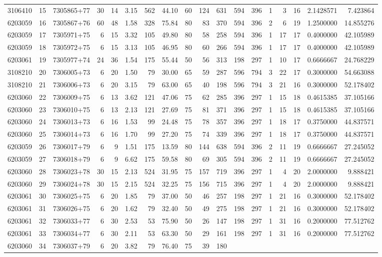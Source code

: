 \documentclass[
]{article}
\begin{document}
\begin{longtable}[]{@{}rrlrrrrrrrrrrrrrrr@{}}
3106410 & 15 & 7305865+77 & 30 & 14 & 3.15 & 562 & 44.10 & 60 & 124 &
631 & 594 & 396 & 1 & 3 & 16 & 2.1428571 & 7.423864\tabularnewline
6203059 & 16 & 7305867+76 & 60 & 48 & 1.58 & 328 & 75.84 & 80 & 83 & 370
& 594 & 396 & 2 & 6 & 19 & 1.2500000 & 14.855276\tabularnewline
6203059 & 17 & 7305971+75 & 6 & 15 & 3.32 & 105 & 49.80 & 80 & 58 & 258
& 594 & 396 & 1 & 17 & 17 & 0.4000000 & 42.105989\tabularnewline
6203059 & 18 & 7305972+75 & 6 & 15 & 3.13 & 105 & 46.95 & 80 & 60 & 266
& 594 & 396 & 1 & 17 & 17 & 0.4000000 & 42.105989\tabularnewline
6203061 & 19 & 7305977+74 & 24 & 36 & 1.54 & 175 & 55.44 & 50 & 56 & 313
& 198 & 297 & 1 & 10 & 17 & 0.6666667 & 24.768229\tabularnewline
3108210 & 20 & 7306005+73 & 6 & 20 & 1.50 & 79 & 30.00 & 65 & 59 & 287 &
596 & 794 & 3 & 22 & 17 & 0.3000000 & 54.663088\tabularnewline
3108210 & 21 & 7306006+73 & 6 & 20 & 3.15 & 79 & 63.00 & 65 & 40 & 198 &
596 & 794 & 3 & 21 & 16 & 0.3000000 & 52.178402\tabularnewline
6203060 & 22 & 7306009+75 & 6 & 13 & 3.62 & 121 & 47.06 & 75 & 62 & 285
& 396 & 297 & 1 & 15 & 18 & 0.4615385 & 37.105166\tabularnewline
6203060 & 23 & 7306010+75 & 6 & 13 & 2.13 & 121 & 27.69 & 75 & 81 & 371
& 396 & 297 & 1 & 15 & 18 & 0.4615385 & 37.105166\tabularnewline
6203060 & 24 & 7306013+73 & 6 & 16 & 1.53 & 99 & 24.48 & 75 & 78 & 357 &
396 & 297 & 1 & 18 & 17 & 0.3750000 & 44.837571\tabularnewline
6203060 & 25 & 7306014+73 & 6 & 16 & 1.70 & 99 & 27.20 & 75 & 74 & 339 &
396 & 297 & 1 & 18 & 17 & 0.3750000 & 44.837571\tabularnewline
6203059 & 26 & 7306017+79 & 6 & 9 & 1.51 & 175 & 13.59 & 80 & 144 & 638
& 594 & 396 & 2 & 11 & 19 & 0.6666667 & 27.245052\tabularnewline
6203059 & 27 & 7306018+79 & 6 & 9 & 6.62 & 175 & 59.58 & 80 & 69 & 305 &
594 & 396 & 2 & 11 & 19 & 0.6666667 & 27.245052\tabularnewline
6203060 & 28 & 7306023+78 & 30 & 15 & 2.13 & 524 & 31.95 & 75 & 157 &
719 & 396 & 297 & 1 & 4 & 20 & 2.0000000 & 9.888421\tabularnewline
6203060 & 29 & 7306024+78 & 30 & 15 & 2.15 & 524 & 32.25 & 75 & 156 &
715 & 396 & 297 & 1 & 4 & 20 & 2.0000000 & 9.888421\tabularnewline
6203061 & 30 & 7306025+75 & 6 & 20 & 1.85 & 79 & 37.00 & 50 & 46 & 257 &
198 & 297 & 1 & 21 & 16 & 0.3000000 & 52.178402\tabularnewline
6203061 & 31 & 7306026+75 & 6 & 20 & 1.62 & 79 & 32.40 & 50 & 49 & 275 &
198 & 297 & 1 & 21 & 16 & 0.3000000 & 52.178402\tabularnewline
6203061 & 32 & 7306033+77 & 6 & 30 & 2.53 & 53 & 75.90 & 50 & 26 & 147 &
198 & 297 & 1 & 31 & 16 & 0.2000000 & 77.512762\tabularnewline
6203061 & 33 & 7306034+77 & 6 & 30 & 2.11 & 53 & 63.30 & 50 & 29 & 161 &
198 & 297 & 1 & 31 & 16 & 0.2000000 & 77.512762\tabularnewline
6203060 & 34 & 7306037+79 & 6 & 20 & 3.82 & 79 & 76.40 & 75 & 39 & 180 &

\end{longtable}
\end{document}
